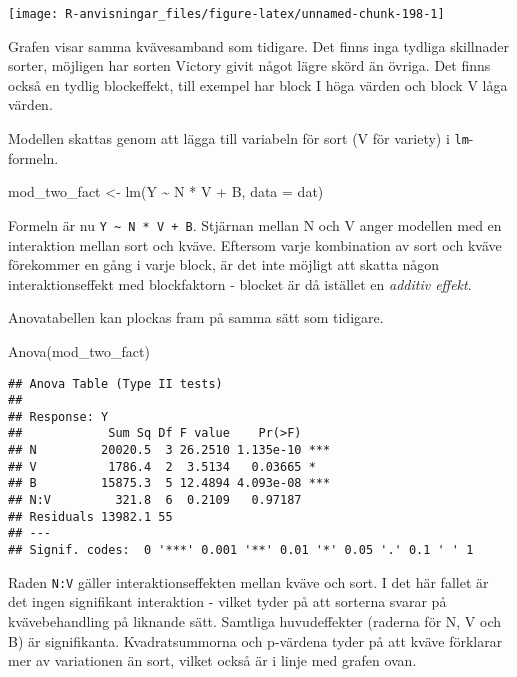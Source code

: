 \documentclass[
]{book}
\newenvironment{Shaded}{\begin{snugshade}}{\end{snugshade}}
\newcommand{\AttributeTok}[1]{\textcolor[rgb]{0.77,0.63,0.00}{#1}}
\newcommand{\FunctionTok}[1]{\textcolor[rgb]{0.00,0.00,0.00}{#1}}
\newcommand{\NormalTok}[1]{#1}
\newcommand{\OtherTok}[1]{\textcolor[rgb]{0.56,0.35,0.01}{#1}}
\newcommand{\SpecialCharTok}[1]{\textcolor[rgb]{0.00,0.00,0.00}{#1}}
\theoremstyle{definition}
\theoremstyle{definition}
\theoremstyle{definition}
\theoremstyle{definition}
\theoremstyle{remark}
\begin{document}
\begin{center}\texttt{[image: R-anvisningar\_files/figure-latex/unnamed-chunk-198-1]} \end{center}

Grafen visar samma kvävesamband som tidigare. Det finns inga tydliga skillnader sorter, möjligen har sorten Victory givit något lägre skörd än övriga. Det finns också en tydlig blockeffekt, till exempel har block I höga värden och block V låga värden.

Modellen skattas genom att lägga till variabeln för sort (V för variety) i \texttt{lm}-formeln.

\begin{Shaded}
\begin{Highlighting}[]
\NormalTok{mod\_two\_fact }\OtherTok{\textless{}{-}} \FunctionTok{lm}\NormalTok{(Y }\SpecialCharTok{\textasciitilde{}}\NormalTok{ N }\SpecialCharTok{*}\NormalTok{ V }\SpecialCharTok{+}\NormalTok{ B, }\AttributeTok{data =}\NormalTok{ dat)}
\end{Highlighting}
\end{Shaded}

Formeln är nu \texttt{Y\ \textasciitilde{}\ N\ *\ V\ +\ B}. Stjärnan mellan N och V anger modellen med en interaktion mellan sort och kväve. Eftersom varje kombination av sort och kväve förekommer en gång i varje block, är det inte möjligt att skatta någon interaktionseffekt med blockfaktorn - blocket är då istället en \emph{additiv effekt}.

Anovatabellen kan plockas fram på samma sätt som tidigare.

\begin{Shaded}
\begin{Highlighting}[]
\FunctionTok{Anova}\NormalTok{(mod\_two\_fact)}
\end{Highlighting}
\end{Shaded}

\begin{verbatim}
## Anova Table (Type II tests)
## 
## Response: Y
##            Sum Sq Df F value    Pr(>F)    
## N         20020.5  3 26.2510 1.135e-10 ***
## V          1786.4  2  3.5134   0.03665 *  
## B         15875.3  5 12.4894 4.093e-08 ***
## N:V         321.8  6  0.2109   0.97187    
## Residuals 13982.1 55                      
## ---
## Signif. codes:  0 '***' 0.001 '**' 0.01 '*' 0.05 '.' 0.1 ' ' 1
\end{verbatim}

Raden \texttt{N:V} gäller interaktionseffekten mellan kväve och sort. I det här fallet är det ingen signifikant interaktion - vilket tyder på att sorterna svarar på kvävebehandling på liknande sätt. Samtliga huvudeffekter (raderna för N, V och B) är signifikanta. Kvadratsummorna och p-värdena tyder på att kväve förklarar mer av variationen än sort, vilket också är i linje med grafen ovan.
\end{document}
